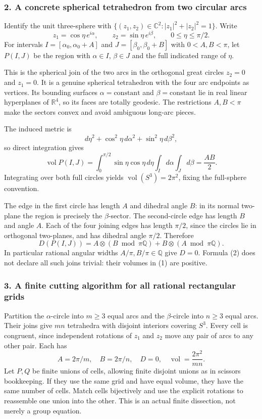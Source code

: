 \documentclass[11pt]{article}
\begin{document}
\subsubsection{2. A concrete spherical tetrahedron from two circular arcs}
Identify the unit three-sphere with
$\{(z_1,z_2)\in\mathbb C^2:|z_1|^2+|z_2|^2=1\}$. Write
\[
 z_1=\cos\eta\,e^{i\alpha},\qquad
 z_2=\sin\eta\,e^{i\beta},\qquad0\le\eta\le\pi/2.
\]
For intervals $I=[\alpha_0,\alpha_0+A]$ and
$J=[\beta_0,\beta_0+B]$ with $0<A,B<\pi$, let $P(I,J)$ be the region with $\alpha\in I$, $\beta\in J$ and the full indicated range of $\eta$.

This is the spherical join of the two arcs in the orthogonal great circles $z_2=0$ and $z_1=0$. It is a genuine spherical tetrahedron with the four arc endpoints as vertices. Its bounding surfaces $\alpha=\text{constant}$ and $\beta=\text{constant}$ lie in real linear hyperplanes of $\mathbb R^4$, so its faces are totally geodesic. The restrictions $A,B<\pi$ make the sectors convex and avoid ambiguous long-arc pieces.

The induced metric is
\[
 d\eta^2+\cos^2\eta\,d\alpha^2+\sin^2\eta\,d\beta^2,
\]
so direct integration gives
\[
 \operatorname{vol}P(I,J)
 =\int_0^{\pi/2}\sin\eta\cos\eta\,d\eta\int_I d\alpha\int_Jd\beta
 =\frac{AB}{2}.                                      \tag{1}
\]
Integrating over both full circles yields $\operatorname{vol}(S^3)=2\pi^2$, fixing the full-sphere convention.

The edge in the first circle has length $A$ and dihedral angle $B$: in its normal two-plane the region is precisely the $\beta$-sector. The second-circle edge has length $B$ and angle $A$. Each of the four joining edges has length $\pi/2$, since the circles lie in orthogonal two-planes, and has dihedral angle $\pi/2$. Therefore
\[
 D(P(I,J))=A\otimes(B\bmod\pi\mathbb Q)
          +B\otimes(A\bmod\pi\mathbb Q).              \tag{2}
\]
In particular rational angular widths $A/\pi,B/\pi\in\mathbb Q$ give $D=0$. Formula (2) does not declare all such joins trivial: their volumes in (1) are positive.

\subsubsection{3. A finite cutting algorithm for all rational rectangular grids}
Partition the $\alpha$-circle into $m\ge3$ equal arcs and the $\beta$-circle into $n\ge3$ equal arcs. Their joins give $mn$ tetrahedra with disjoint interiors covering $S^3$. Every cell is congruent, since independent rotations of $z_1$ and $z_2$ move any pair of arcs to any other pair. Each has
\[
 A=2\pi/m,\quad B=2\pi/n,\quad D=0,\quad
 \operatorname{vol}=\frac{2\pi^2}{mn}.                 \tag{3}
\]
Let $P,Q$ be finite unions of cells, allowing finite disjoint unions as in scissors bookkeeping. If they use the same grid and have equal volume, they have the same number of cells. Match cells bijectively and use the explicit rotations to reassemble one union into the other. This is an actual finite dissection, not merely a group equation.
\end{document}
